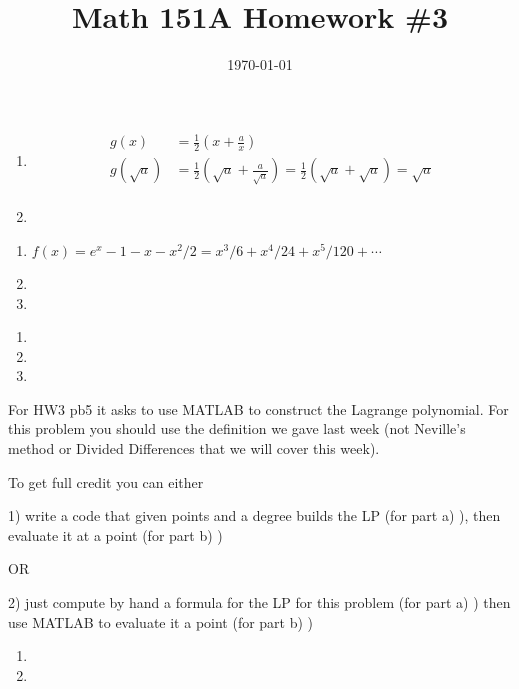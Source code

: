 \documentclass{article}
\date{\today}
\title{Math 151A Homework \#3}
\begin{document}
\maketitle

\bigskip
\begin{prob}
\end{prob}
\begin{enumerate}[label=(\alph*)]
    \item \begin{align*}
            g(x) &= \frac{1}{2} \left( x + \frac{a}{x} \right) \\
            g( \sqrt{a}) &= \frac{1}{2} \left( \sqrt{a} + \frac{a}{\sqrt{a}} \right) = \frac{1}{2} \left( \sqrt{a} + \sqrt{a} \right) = \sqrt{a} \\
    \end{align*}
    \item
\end{enumerate}


\bigskip
\begin{prob}
\end{prob}
\begin{enumerate}[label=(\alph*)]
    \item $f(x) = e^x - 1 - x - x^2/2 = x^3/6 + x^4/24 + x^5/120 + \cdots$
    \item
    \item
\end{enumerate}


\bigskip
\begin{prob}
\end{prob}

\bigskip
\begin{prob}
\end{prob}
\begin{enumerate}[label=(\alph*)]
    \item
    \item
    \item
\end{enumerate}

\bigskip
\begin{prob}
\end{prob}

For HW3 pb5 it asks to use MATLAB to construct the Lagrange polynomial. For this problem you should use the definition we gave last week (not Neville's method or Divided Differences that we will cover this week).

To get full credit you can either

1) write a code that given points and a degree builds the LP (for part a) ), then evaluate it at a point (for part b) )

OR

2) just compute by hand a formula for the LP for this problem (for part a) ) then use MATLAB to evaluate it a point (for part b) )
\begin{enumerate}[label=(\alph*)]
    \item
    \item
\end{enumerate}
\end{document}

